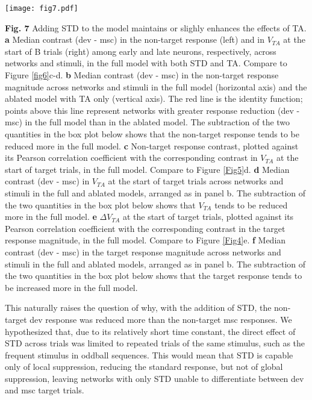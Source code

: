 \documentclass[pdflatex,referee,iicol,sn-basic]{sn-jnl}
\theoremstyle{thmstyleone}%
\theoremstyle{thmstyletwo}%
\theoremstyle{thmstylethree}%
\begin{document}
\begin{figure*}%
    \centering
    \texttt{[image: fig7.pdf]}
    \caption{}
    \label{fig7}
\end{figure*}
\textbf{Fig. 7} Adding STD to the model maintains or slighly enhances the effects of TA.
\textbf{a} Median contrast (dev - msc) in the non-target response (left) and in $V_{TA}$ at the start of B trials (right) among early and late neurons, respectively, across networks and stimuli, in the full model with both STD and TA. Compare to Figure \ref{fig6}c-d.
\textbf{b} Median contrast (dev - msc) in the non-target response magnitude across networks and stimuli in the full model (horizontal axis) and the ablated model with TA only (vertical axis). The red line is the identity function; points above this line represent networks with greater response reduction (dev - msc) in the full model than in the ablated model. The subtraction of the two quantities in the box plot below shows that the non-target response tends to be reduced more in the full model.
\textbf{c} Non-target response contrast, plotted against its Pearson correlation coefficient with the corresponding contrast in $V_{TA}$ at the start of target trials, in the full model. Compare to Figure \ref{Fig5}d.
\textbf{d} Median contrast (dev - msc) in $V_{TA}$ at the start of target trials across networks and stimuli in the full and ablated models, arranged as in panel b. The subtraction of the two quantities in the box plot below shows that $V_{TA}$ tends to be reduced more in the full model.
\textbf{e} $\Delta V_{TA}$ at the start of target trials, plotted against its Pearson correlation coefficient with the corresponding contrast in the target response magnitude, in the full model. Compare to Figure \ref{Fig4}e.
\textbf{f} Median contrast (dev - msc) in the target response magnitude across networks and stimuli in the full and ablated models, arranged as in panel b. The subtraction of the two quantities in the box plot below shows that the target response tends to be increased more in the full model.

This naturally raises the question of why, with the addition of STD, the non-target dev response was reduced more than the non-target msc responses. We hypothesized that, due to its relatively short time constant, the direct effect of STD across trials was limited to repeated trials of the same stimulus, such as the frequent stimulus in oddball sequences. This would mean that STD is capable only of local suppression, reducing the standard response, but not of global suppression, leaving networks with only STD unable to differentiate between dev and msc target trials.
\end{document}
